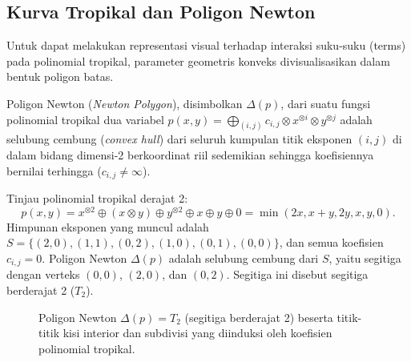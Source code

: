\subsection{Kurva Tropikal dan Poligon Newton}
Untuk dapat melakukan representasi visual terhadap interaksi suku-suku (terms) pada polinomial tropikal, parameter geometris konveks divisualisasikan dalam bentuk poligon batas.
\begin{definisi}
  Poligon Newton (\textit{Newton Polygon}), disimbolkan $\Delta(p)$, dari suatu fungsi polinomial tropikal dua variabel $p(x, y) = \bigoplus_{(i,j)} c_{i,j} \otimes x^{\otimes i} \otimes y^{\otimes j}$ adalah selubung cembung (\textit{convex hull}) dari seluruh kumpulan titik eksponen $(i,j)$ di dalam bidang dimensi-2 berkoordinat riil sedemikian sehingga koefisiennya bernilai terhingga ($c_{i,j} \ne \infty$).
\end{definisi}

\begin{contoh}
  Tinjau polinomial tropikal derajat 2:
  \[
    p(x,y) = x^{\otimes 2} \oplus (x \otimes y) \oplus y^{\otimes 2} \oplus x \oplus y \oplus 0 = \min(2x, x+y, 2y, x, y, 0).
  \]
  Himpunan eksponen yang muncul adalah $S = \{(2,0), (1,1), (0,2), (1,0), (0,1), (0,0)\}$, dan semua koefisien $c_{i,j} = 0$. Poligon Newton $\Delta(p)$ adalah selubung cembung dari $S$, yaitu segitiga dengan verteks $(0,0)$, $(2,0)$, dan $(0,2)$. Segitiga ini disebut segitiga berderajat 2 ($T_2$).
\end{contoh}

\begin{figure}[H]
  \centering
  \caption{Poligon Newton $\Delta(p) = T_2$ (segitiga berderajat 2) beserta titik-titik kisi interior dan subdivisi yang diinduksi oleh koefisien polinomial tropikal.}
  \label{fig:newton_polygon_new}
\end{figure}

